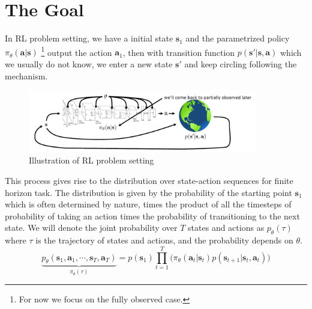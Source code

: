\documentclass{tufte-handout}
\newcommand{\s}{\mathbf{s}}
\newcommand{\act}{\mathbf{a}}
\begin{document}

\section{The Goal}

In RL problem setting, we have a initial state $\s_1$ and the parametrized policy $\pi_\theta(\act|\s)$ \thanks{For now we focus on the fully observed case.} output the action $\act_1$, then with transition function $p(\s' | \s, \act)$ which we usually do not know, we enter a new state $\s'$ and keep circling following the mechanism.

\begin{figure}
  \includegraphics[width= 10cm]{goal}
  \caption{Illustration of RL problem setting}
  \label{fig: goal}
\end{figure}

This process gives rise to the distribution over state-action sequences for finite horizon task. The distribution is given by the probability of the starting point $\s_1$ which is often determined by nature, times the product of all the timesteps of probability of taking an action times the probability of transitioning to the next state. We will denote the joint probability over $T$ states and actions as $p_\theta(\tau)$ where $\tau$ is the trajectory of states and actions, and the probability depends on $\theta$.
\[
\underbrace{p_\theta(\s_1, \act_1, \cdots , \s_T, \act_T)}_{\pi_\theta (\tau)} =
  p(\s_1) \prod _{t=1}^T \big(\pi_\theta (\act_t | \s_t) p(\s_{t+1} | \s_t, \act_t)\big)
\]
\end{document}
